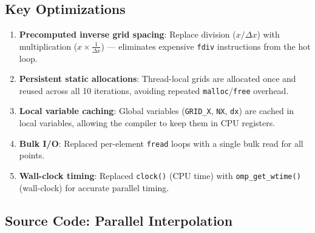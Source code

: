 \documentclass[12pt,a4paper]{article}
\begin{document}
\subsection{Key Optimizations}

\begin{enumerate}
    \item \textbf{Precomputed inverse grid spacing}: Replace division ($x / \Delta x$) with multiplication ($x \times \frac{1}{\Delta x}$) — eliminates expensive \texttt{fdiv} instructions from the hot loop.
    
    \item \textbf{Persistent static allocations}: Thread-local grids are allocated once and reused across all 10 iterations, avoiding repeated \texttt{malloc}/\texttt{free} overhead.
    
    \item \textbf{Local variable caching}: Global variables (\texttt{GRID\_X}, \texttt{NX}, \texttt{dx}) are cached in local variables, allowing the compiler to keep them in CPU registers.
    
    \item \textbf{Bulk I/O}: Replaced per-element \texttt{fread} loops with a single bulk read for all points.
    
    \item \textbf{Wall-clock timing}: Replaced \texttt{clock()} (CPU time) with \texttt{omp\_get\_wtime()} (wall-clock) for accurate parallel timing.
\end{enumerate}

\subsection{Source Code: Parallel Interpolation}
\end{document}
